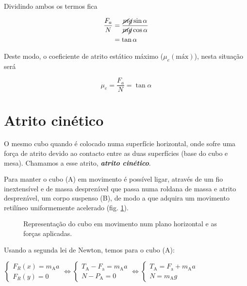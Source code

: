 \documentclass{article}
\newcommand{\toliv}[1]{\textcolor{olive!80}{\textbf{#1}}}
\begin{document}
	Dividindo ambos os termos fica
	
	\begin{align*}
		\dfrac{F_a}{N} &= \dfrac{\cancel{m} \cancel{g} \sin \alpha}{\cancel{m} \cancel{g} \cos \alpha}\\
					   &= \tan \alpha
	\end{align*}
	
	Deste modo, o coeficiente de atrito estático máximo ($\mu_e(\text{máx})$), nesta situação será
	
	\begin{equation}
		\boxed{\mu_e = \dfrac{F_a}{N} = \tan \alpha}
		\label{eq:atrito_estatico}
	\end{equation}
	
	
	\section{Atrito cinético}
	
	O mesmo cubo quando é colocado numa superfície horizontal, onde sofre uma força de atrito devido ao contacto entre as duas superfícies (base do cubo e mesa). Chamamos a esse atrito, \toliv{\textbf{\textit{atrito cinético}}}.
	
	Para manter o cubo (A) em movimento é possível ligar, através de um fio inextensível e de massa desprezável que passa numa roldana de massa e atrito desprezável,  um corpo suspenso (B), de modo a que adquira um movimento retilíneo uniformemente acelerado (fig. \ref{fig:block_horiz}).
	
	\begin{figure}[H]
		\centering
		\resizebox{0.9\linewidth}{!}{%
			
		}
		\caption{Representação do cubo em movimento num plano horizontal e as forças aplicadas.}
		\label{fig:block_horiz}
	\end{figure}
	
	Usando a segunda lei de Newton, temos para o cubo (A):
	
	\begin{center}
		$
		\begin{cases}
			F_R(x) = m_\text{A} a\\
			F_R(y) = 0
		\end{cases}
		\Leftrightarrow
		\begin{cases}
			T_\text{A} - F_\text{a} = m_\text{A} a\\
			N - P_\text{A} = 0
		\end{cases}
		\Leftrightarrow
		\begin{cases}
			T_\text{A} = F_\text{a} +m_\text{A} a\\
			N = m_\text{A} g
		\end{cases}
		$
	\end{center}
	
\end{document}
